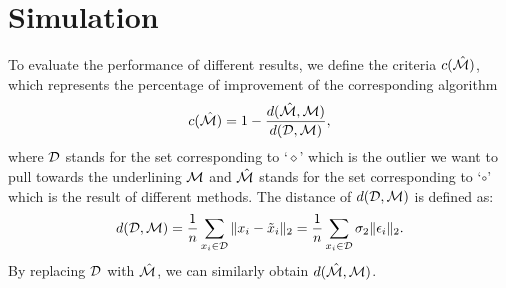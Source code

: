 \documentclass{article}
\theoremstyle{remark}
\begin{document}
\section{Simulation}
To evaluate the performance of different results, we define the criteria $c({\hat{\cal M}})$,  which represents the percentage of improvement of the corresponding algorithm
\[
c({\hat{\cal M}}) = 1-\frac{d(\hat{\cal M}, {\cal M})}{d({\cal D}, {\cal M})},
\] 
where $\cal D$ stands for the set corresponding to `$\diamond$' which is the outlier we want to pull towards the underlining $\cal M$ and $\hat{\cal M}$ stands for the set corresponding to `$\circ$' which is the result of different methods. The distance of $d({\cal D}, {\cal M})$ is defined as:
\[
d({\cal D}, {\cal M}) = \frac{1}{n} \sum_{x_i\in {\cal D}} \|x_i-\tilde{x}_i\|_2 = \frac{1}{n} \sum_{x_i\in \cal D} \sigma_2\|\epsilon_i\|_2.
\] 
By replacing $\cal D$ with $\hat{\cal M}$, we can similarly obtain $d(\hat{\cal M}, {\cal M})$.
\end{document}
